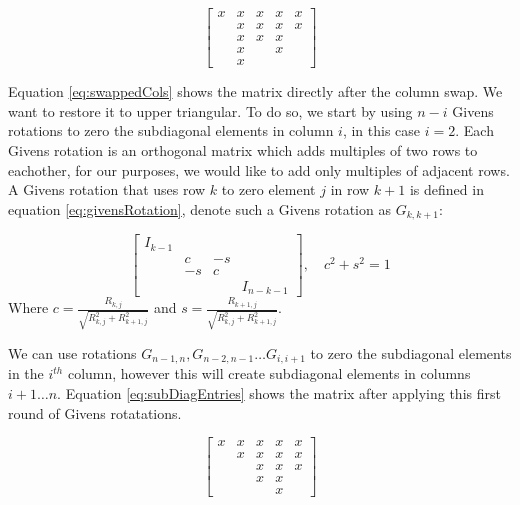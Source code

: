 \documentclass[12pt,Bold,letterpaper]{mcgilletdclass}
\begin{document}
\begin{equation} \label{eq:swappedCols}
\begin{bmatrix}
x & x & x & x & x\\ 
  & x & x & x & x\\ 
  & x & x & x &  \\ 
  & x &  &  x &  \\ 
  & x &  &    & 
\end{bmatrix}
\end{equation}

Equation \ref{eq:swappedCols} shows the matrix directly after the column swap. We want to restore it to upper triangular. To do so, we start by using $n-i$ Givens rotations to zero the subdiagonal elements in column $i$, in this case $i = 2$. Each Givens rotation is an orthogonal matrix which adds multiples of two rows to eachother, for our purposes, we would like to add only multiples of adjacent rows. A Givens rotation that uses row $k$ to zero element $j$ in row $k+1$ is defined in equation \eqref{eq:givensRotation}, denote such a Givens rotation as $G_{k,k+1}$:

\begin{equation} \label{eq:givensRotation}
\begin{bmatrix}
I_{k-1} &  &  & \\ 
 & c & -s & \\ 
 & -s & c & \\ 
 &  &  & I_{n-k-1}
\end{bmatrix} ,\quad c^2+s^2=1
\end{equation}
Where $c=\frac{R_{k,j}}{\sqrt{R_{k,j}^2+R_{k+1,j}^2}}$ and $s=\frac{R_{k+1,j}}{\sqrt{R_{k,j}^2+R_{k+1,j}^2}}$.

We can use rotations $G_{n-1,n}, G_{n-2,n-1} \dots G_{i,i+1}$ to zero the subdiagonal elements in the $i^{th}$ column, however this will create subdiagonal elements in columns $i+1 \dots n$. Equation \eqref{eq:subDiagEntries} shows the matrix after applying this first round of Givens rotatations.

\begin{equation} \label{eq:subDiagEntries}
\begin{bmatrix}
x & x & x & x & x \\ 
  & x & x & x & x \\ 
  &   & x & x & x \\ 
  &   & x & x &   \\ 
  &   &  &  x & 
\end{bmatrix}
\end{equation}
\end{document}
